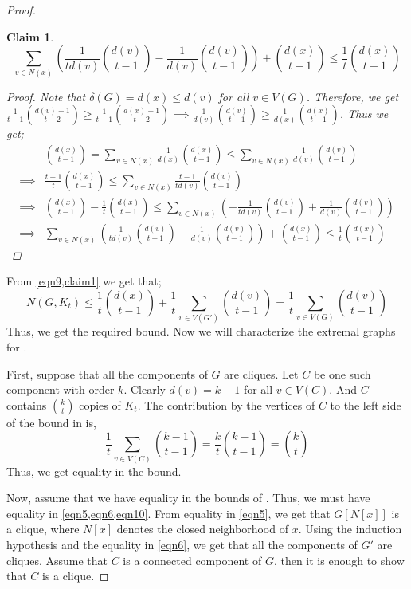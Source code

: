\documentclass[pdflatex,sn-basic,Numbered]{sn-jnl}
\newtheorem{claim}{Claim}
\begin{document}
\begin{proof}
\begin{claim}
    \[\sum_{v \in N(x)}\left(\frac{1}{td(v)}{d(v) \choose t-1} - \frac{1}{d(v)}{d(v) \choose t-1}\right) + {d(x) \choose t-1} \leq \frac{1}{t}{d(x) \choose t-1}\]
    \begin{proof}
        Note that $\delta(G) =d(x) \leq d(v)$ for all $v \in V(G)$. Therefore, we get $\frac{1}{t-1}{d(v)-1\choose t-2} \geq \frac{1}{t-1}{d(x)-1\choose t-2}\implies \frac{1}{d(v)}{d(v) \choose t-1} \geq \frac{1}{d(x)}{d(x) \choose t-1}$. Thus we get;
        \begin{align}\label{eqn10}
            & {d(x) \choose t-1} = \sum_{v \in N(x)}\frac{1}{d(x)}{d(x) \choose t-1} \leq \sum_{v \in N(x)}\frac{1}{d(v)}{d(v)\choose t-1} \\
            \implies & \frac{t-1}{t}{d(x) \choose t-1} \leq \sum_{v \in N(x)} \frac{t-1}{td(v)}{d(v)\choose t-1}\nonumber \\
            \implies & {d(x) \choose t-1} - \frac{1}{t}{d(x) \choose t-1} \leq \sum_{v \in N(x)}\left(-\frac{1}{td(v)}{d(v) \choose t-1} + \frac{1}{d(v)}{d(v) \choose t-1}\right)\nonumber\\
            \implies & \sum_{v \in N(x)}\left(\frac{1}{td(v)}{d(v) \choose t-1} - \frac{1}{d(v)}{d(v) \choose t-1}\right) + {d(x) \choose t-1} \leq \frac{1}{t}{d(x) \choose t-1}\nonumber
        \end{align}
  \end{proof}
\end{claim}
From \cref{eqn9,claim1} we get that;
\[N(G,K_t) \leq \frac{1}{t}{d(x) \choose t-1} +\frac{1}{t}\sum_{v \in V(G')}{d(v) \choose t-1} = \frac{1}{t}\sum_{v \in V(G)}{d(v) \choose t-1}\]
Thus, we get the required bound. Now we will characterize the extremal graphs for .

First, suppose that all the components of $G$ are cliques. Let $C$ be one such component with order $k$. Clearly $d(v) = k-1$ for all $v \in V(C)$. And $C$ contains ${k \choose t}$ copies of $K_t$. The contribution by the vertices of $C$ to the left side of the bound in  is, 
\[\frac{1}{t}\sum_{v \in V(C)}{k-1\choose t-1} = \frac{k}{t}{k-1\choose t-1} = {k\choose t}\]
Thus, we get equality in the bound.

Now, assume that we have equality in the bounds of . Thus, we must have equality in \cref{eqn5,eqn6,eqn10}. From equality in \cref{eqn5}, we get that $G[N[x]]$ is a clique, where $N[x]$ denotes the closed neighborhood of $x$. Using the induction hypothesis and the equality in \cref{eqn6}, we get that all the components of $G'$ are cliques. Assume that $C$ is a connected component of $G$, then it is enough to show that $C$ is a clique. 


\end{proof}
\end{document}
